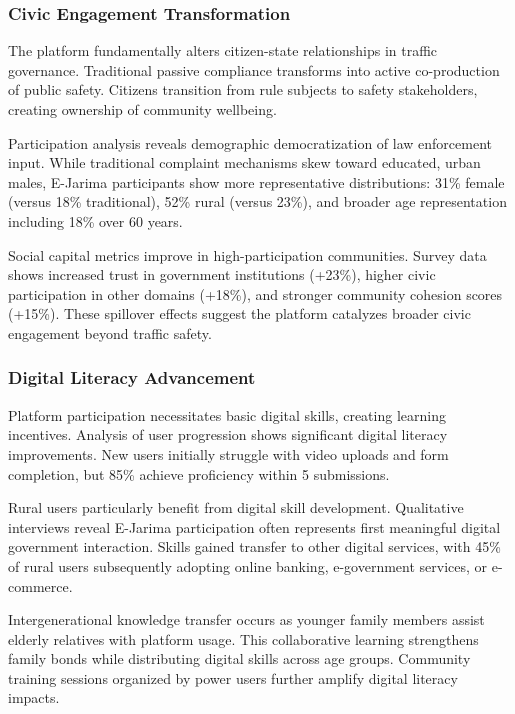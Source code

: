 \documentclass[pdflatex,sn-mathphys-num]{sn-jnl}%
\theoremstyle{thmstyleone}%
\theoremstyle{thmstyletwo}%
\theoremstyle{thmstylethree}%
\begin{document}
\subsubsection{Civic Engagement Transformation}

The platform fundamentally alters citizen-state relationships in traffic governance. Traditional passive compliance transforms into active co-production of public safety. Citizens transition from rule subjects to safety stakeholders, creating ownership of community wellbeing.

Participation analysis reveals demographic democratization of law enforcement input. While traditional complaint mechanisms skew toward educated, urban males, E-Jarima participants show more representative distributions: 31\% female (versus 18\% traditional), 52\% rural (versus 23\%), and broader age representation including 18\% over 60 years.

Social capital metrics improve in high-participation communities. Survey data shows increased trust in government institutions (+23\%), higher civic participation in other domains (+18\%), and stronger community cohesion scores (+15\%). These spillover effects suggest the platform catalyzes broader civic engagement beyond traffic safety.

\subsubsection{Digital Literacy Advancement}

Platform participation necessitates basic digital skills, creating learning incentives. Analysis of user progression shows significant digital literacy improvements. New users initially struggle with video uploads and form completion, but 85\% achieve proficiency within 5 submissions.

Rural users particularly benefit from digital skill development. Qualitative interviews reveal E-Jarima participation often represents first meaningful digital government interaction. Skills gained transfer to other digital services, with 45\% of rural users subsequently adopting online banking, e-government services, or e-commerce.

Intergenerational knowledge transfer occurs as younger family members assist elderly relatives with platform usage. This collaborative learning strengthens family bonds while distributing digital skills across age groups. Community training sessions organized by power users further amplify digital literacy impacts.
\end{document}
